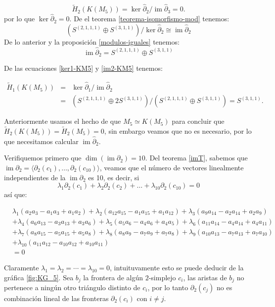 \documentclass[12pt]{book}
\theoremstyle{definition}
\DeclareMathOperator{\im}{im}
\newcounter{in}
\begin{document}
\begin{equation*}
\widetilde H_{2}(K(M_{5}))=\ker \widehat\partial_{2}/\im \widehat\partial_{3}=0.
\end{equation*}
por lo que $\ker \widehat\partial_{2}=0$. De el teorema
\ref{teorema-isomorfismo-mod} tenemos:
$$(S^{(2,1,1,1)}\oplus S^{(3,1,1)})/\ker \widehat\partial_{2}\cong \im
\widehat\partial_{2}$$
De lo anterior y la proposición \ref{modulos-iguales} tenemos:
\begin{equation}
\im \widehat\partial_{2}=S^{(2,1,1,1)}\oplus S^{(3,1,1)}
\label{im2-KM5}
\end{equation}

De las ecuaciones \ref{ker1-KM5} y \ref{im2-KM5} tenemos:

\begin{eqnarray*}
  \widetilde H_{1}(K(M_{5}))&=&\ker \widehat\partial_{1}/\im
  \widehat\partial_{2}\\
  &=&(S^{(2,1,1,1)}\oplus 2S^{(3,1,1)})/(S^{(2,1,1,1)}\oplus S^{(3,1,1)})=S^{(3,1,1)}.
\end{eqnarray*}

Anteriormente usamos el hecho de que $M_{5}\simeq K(M_{5})$  para
concluir que $\widetilde H_{2}(K(M_{5}))=\widetilde H_{2}(M_{5})=0$, sin embargo veamos que no es necesario, por lo que
necesitamos calcular $\im \widehat\partial_{2}$. 

Verifiquemos primero que $\dim(\im \partial_{2})=10$. Del teorema
\ref{imT}, sabemos que
$\im \partial_{2}=\langle\partial_{2}(c_{1}),\ldots,\partial_{2}(c_{10})\rangle$,
veamos que el número de vectores linealmente independientes de la
$\im \partial_{2}$ es 10, es
decir, si
$$\lambda_{1}\partial_{2}(c_{1})+\lambda_{2}\partial_{2}(c_{2})+\ldots+\lambda_{10}\partial_{2}(c_{10})=0$$
así que:

\begin{footnotesize}
  \begin{align*}
    &\lambda_{1}(a_{2}a_{3}-a_{1}a_{3}+a_{1}a_{2})+\lambda_{2}(a_{12}a_{15}-a_{1}a_{15}+a_{1}a_{12})+\lambda_{3}(a_{9}a_{14}-a_{2}a_{14}+a_{2}a_{9})\\
    &+\lambda_{4}(a_{6}a_{13}-a_{3}a_{13}+a_{3}a_{6})+\lambda_{5}(a_{5}a_{6}-a_{4}a_{6}+a_{4}a_{5})+\lambda_{6}(a_{11}a_{14}-a_{4}a_{14}+a_{4}a_{11})\\
    &+\lambda_{7}(a_{8}a_{15}-a_{5}a_{15}+a_{5}a_{8})+\lambda_{8}(a_{8}a_{9}-a_{7}a_{9}+a_{7}a_{8})+\lambda_{9}(a_{10}a_{13}-a_{7}a_{13}+a_{7}a_{10})\\
    &+\lambda_{10}(a_{11}a_{12}-a_{10}a_{12}+a_{10}a_{11})\\
    &=0
  \end{align*}
\end{footnotesize}
Claramente $\lambda_{1}=\lambda_{2}=\cdots=\lambda_{10}=0$,
intuituvamente esto se puede deducir de la gráfica \ref{fig:KG_5}.
Sea $b_{j}$ la frontera de algún $2$-simplejo $c_{i}$, las aristas
de $b_{j}$ no pertenece a ningún otro triángulo distinto de $c_{i}$, por
lo tanto $\partial_{2}(c_{j})$ no es combinación lineal de las fronteras
$\partial_{2}(c_{i})$ con $i\neq j$.
\end{document}

